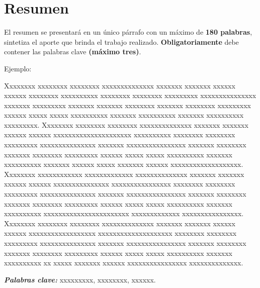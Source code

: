 \chapter*{Resumen}

El resumen se presentará en un único párrafo con un máximo de \textbf{180 palabras}, sintetiza el aporte que brinda el trabajo realizado. \textbf{Obligatoriamente} debe contener las palabras clave \textbf{(máximo tres)}.

\vspace{0.5cm}

Ejemplo:

\vspace{0.5cm}

Xxxxxxxx xxxxxxxx xxxxxxxx xxxxxxxxxxxxxx xxxxxxx xxxxxxx xxxxxx xxxxxx xxxxxxxx xxxxxxxxxx xxxxxxxx xxxxxxxx xxxxxxxxx xxxxxxxxxxxxxxx xxxxxxx xxxxxxxxx xxxxxxx xxxxxxx xxxxxxxx xxxxxxx xxxxxxxx xxxxxxxxx xxxxxx xxxxx xxxxx xxxxxxxxxx xxxxxxx xxxxxxxxxx xxxxxxx xxxxxxxxxx xxxxxxxxx. Xxxxxxxx xxxxxxxx xxxxxxxx xxxxxxxxxxxxxx xxxxxxx xxxxxxx xxxxxx xxxxxx xxxxxxxxxxxxxxxxxxxxx xxxxxxxxxx xxxxxxxx xxxxxxxx xxxxxxxxx xxxxxxxxxxxxxxx xxxxxxx xxxxxxxxxxxxxxxx xxxxxxx xxxxxxxx xxxxxxx xxxxxxxx xxxxxxxxx xxxxxx xxxxx xxxxx xxxxxxxxxx xxxxxxx xxxxxxxxxx xxxxxxx xxxxxx xxxxx xxxxxxx xxxxxx xxxxxxxxxxxxxxxxxxx. Xxxxxxxx xxxxxxxxxxxx xxxxxxxxxxxxx xxxxxxxxxxxxxx xxxxxxx xxxxxxx xxxxxx xxxxxx xxxxxxxxxxxxxxx xxxxxxxxxxxxxxxx xxxxxxxx xxxxxxxx xxxxxxxxx xxxxxxxxxxxxxxx xxxxxxx xxxxxxxxxxxxxxxx xxxxxxx xxxxxxxx xxxxxxx xxxxxxxx xxxxxxxxx xxxxxx xxxxx xxxxx xxxxxxxxxx xxxxxxx xxxxxxxxxx xxxxxxxxxxxxxxxxxxxxxxx xxxxxxxxxxxxx xxxxxxxxxxxxxxxx. Xxxxxxxx xxxxxxxx xxxxxxxx xxxxxxxxxxxxxx xxxxxxx xxxxxxx xxxxxx xxxxxx xxxxxxxxxxxxxxxxxx xxxxxxxxxxxxxxxxxxxx xxxxxxxx xxxxxxxx xxxxxxxxx xxxxxxxxxxxxxxx xxxxxxx xxxxxxxxxxxxxxxx xxxxxxx xxxxxxxx xxxxxxx xxxxxxxx xxxxxxxxx xxxxxx xxxxx xxxxx xxxxxxxxxx xxxxxxx xxxxxxxxxx xx xxxxx xxxxxxx xxxxxx xxxxxxxxxxxxxxxx xxxxxxxxxxxxxx.

\vspace{0.5cm}

\textbf{\textit{Palabras clave:}} xxxxxxxxx, xxxxxxxx, xxxxxx.